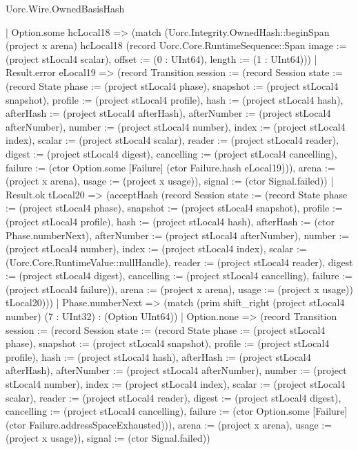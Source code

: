 \begin{lexlean}{Uorc.Wire.OwnedBasisHash}
\begin{semanticmodule}
{        | Option.some hcLocal18 => (match (Uorc.Integrity.OwnedHash::beginSpan (project x arena) hcLocal18 (record Uorc.Core.RuntimeSequence::Span {image := (project stLocal4 scalar), offset := (0 : UInt64), length := (1 : UInt64)}))
          | Result.error eLocal19 => (record Transition {session := (record Session {state := (record State {phase := (project stLocal4 phase), snapshot := (project stLocal4 snapshot), profile := (project stLocal4 profile), hash := (project stLocal4 hash), afterHash := (project stLocal4 afterHash), afterNumber := (project stLocal4 afterNumber), number := (project stLocal4 number), index := (project stLocal4 index), scalar := (project stLocal4 scalar), reader := (project stLocal4 reader), digest := (project stLocal4 digest), cancelling := (project stLocal4 cancelling), failure := (ctor Option.some [Failure] (ctor Failure.hash eLocal19))}), arena := (project x arena), usage := (project x usage)}), signal := (ctor Signal.failed)})
          | Result.ok tLocal20 => (acceptHash (record Session {state := (record State {phase := (project stLocal4 phase), snapshot := (project stLocal4 snapshot), profile := (project stLocal4 profile), hash := (project stLocal4 hash), afterHash := (ctor Phase.numberNext), afterNumber := (project stLocal4 afterNumber), number := (project stLocal4 number), index := (project stLocal4 index), scalar := (Uorc.Core.RuntimeValue::nullHandle), reader := (project stLocal4 reader), digest := (project stLocal4 digest), cancelling := (project stLocal4 cancelling), failure := (project stLocal4 failure)}), arena := (project x arena), usage := (project x usage)}) tLocal20)))
      | Phase.numberNext => (match (prim shift_right (project stLocal4 number) (7 : UInt32) : (Option UInt64))
        | Option.none => (record Transition {session := (record Session {state := (record State {phase := (project stLocal4 phase), snapshot := (project stLocal4 snapshot), profile := (project stLocal4 profile), hash := (project stLocal4 hash), afterHash := (project stLocal4 afterHash), afterNumber := (project stLocal4 afterNumber), number := (project stLocal4 number), index := (project stLocal4 index), scalar := (project stLocal4 scalar), reader := (project stLocal4 reader), digest := (project stLocal4 digest), cancelling := (project stLocal4 cancelling), failure := (ctor Option.some [Failure] (ctor Failure.addressSpaceExhausted))}), arena := (project x arena), usage := (project x usage)}), signal := (ctor Signal.failed)})
}
\end{semanticmodule}
\end{lexlean}
